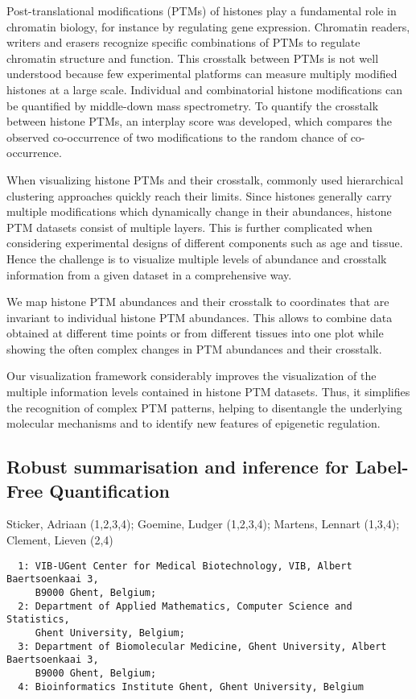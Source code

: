{Post-translational modifications (PTMs) of histones play a fundamental role in chromatin biology, for instance by regulating gene expression. Chromatin readers, writers and erasers recognize specific combinations of PTMs to regulate chromatin structure and function. This crosstalk between PTMs is not well understood because few experimental platforms can measure multiply modified histones at a large scale. Individual and combinatorial histone modifications can be quantified by middle-down mass spectrometry. To quantify the crosstalk between histone PTMs, an interplay score was developed, which compares the observed co-occurrence of two modifications to the random chance of co-occurrence.

When visualizing histone PTMs and their crosstalk, commonly used hierarchical clustering approaches quickly reach their limits. Since histones generally carry multiple modifications which dynamically change in their abundances, histone PTM datasets consist of multiple layers. This is further complicated when considering experimental designs of different components such as age and tissue. Hence the challenge is to visualize multiple levels of abundance and crosstalk information from a given dataset in a comprehensive way.

We map histone PTM abundances and their crosstalk to coordinates that are invariant to individual histone PTM abundances. This allows to combine data obtained at different time points or from different tissues into one plot while showing the often complex changes in PTM abundances and their crosstalk.

Our visualization framework considerably improves the visualization of the multiple information levels contained in histone PTM datasets. Thus, it simplifies the recognition of complex PTM patterns, helping to disentangle the underlying molecular mechanisms and to identify new features of epigenetic regulation.


\subsection*{\color{eubicRed} Robust summarisation and inference for Label-Free Quantification}
{\color{eubicGray}Sticker, Adriaan (1,2,3,4);
Goemine, Ludger (1,2,3,4);
Martens, Lennart (1,3,4);
Clement, Lieven (2,4)}
{\color{eubicGray}\begin{verbatim}
  1: VIB-UGent Center for Medical Biotechnology, VIB, Albert Baertsoenkaai 3,
     B9000 Ghent, Belgium;
  2: Department of Applied Mathematics, Computer Science and Statistics,
     Ghent University, Belgium;
  3: Department of Biomolecular Medicine, Ghent University, Albert Baertsoenkaai 3,
     B9000 Ghent, Belgium;
  4: Bioinformatics Institute Ghent, Ghent University, Belgium
\end{verbatim}}

}
